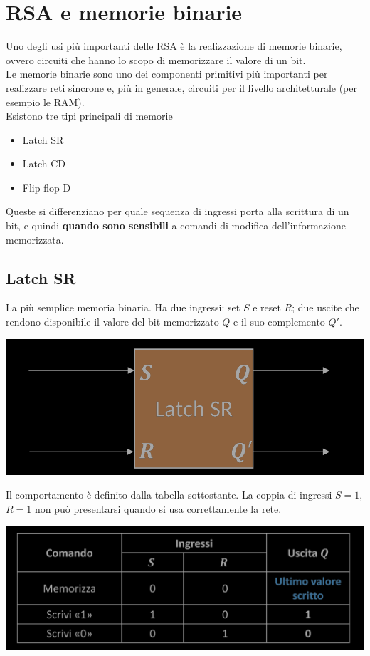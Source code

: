 \documentclass{article}
\begin{document}
\section{RSA e memorie binarie}
Uno degli usi più importanti delle RSA è la realizzazione di memorie binarie, ovvero circuiti che hanno lo scopo di memorizzare il valore di un bit.\\
Le memorie binarie sono uno dei componenti primitivi più importanti per realizzare reti sincrone e, più in generale, circuiti per il livello architetturale (per esempio le RAM).\\
Esistono tre tipi principali di memorie
\begin{itemize}
    \item  Latch SR
    \item Latch CD
    \item Flip-flop D
\end{itemize}
Queste si differenziano per quale sequenza di ingressi porta alla scrittura di un bit, e quindi \textbf{\color{blue}quando sono sensibili} a comandi di modifica dell’informazione memorizzata.
\subsection{Latch SR}
La più semplice memoria binaria. Ha due ingressi: set $S$ e reset $R$; due uscite che rendono disponibile il valore del bit memorizzato $Q$ e il suo complemento $Q'$.
\begin{center}
    \includegraphics[scale=0.4]{latch SR.png}
\end{center}
Il comportamento è definito dalla tabella sottostante. La coppia di ingressi $S=1$, $R=1$ non può presentarsi quando si usa correttamente la rete.
\begin{center}
    \includegraphics[scale=0.4]{SRcomportamento.png}
\end{center}
\end{document}
